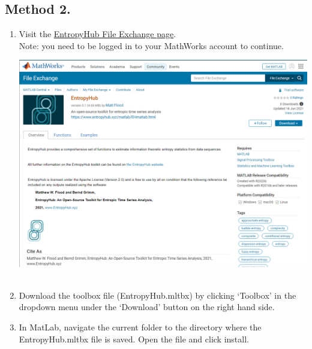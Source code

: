 \documentclass[12pt, a4paper, titlepage, openany]{book}
\begin{document}
\subsection*{\normalsize Method 2.}
\begin{enumerate}
\item Visit the \href{https://www.mathworks.com/matlabcentral/fileexchange/94185-entropyhub}{EntropyHub File Exchange page}. \\
Note: you need to be logged in to your MathWorks account to continue.\\
\begin{minipage}[h]{\linewidth}
          \centering
          \includegraphics[scale=.35]{matfileexchange.png}\\ \ \\
          \medskip
\end{minipage}
\item Download the toolbox file (EntropyHub.mltbx) by clicking ‘Toolbox’ in the dropdown menu under the ‘Download’ button on the right hand side.
\item	In MatLab, navigate the current folder to the directory where the EntropyHub.mltbx file is saved. Open the file and click install.\\ \ \\
\begin{minipage}[h]{\linewidth}
          \centering

\end{minipage}
\end{enumerate}
\end{document}
